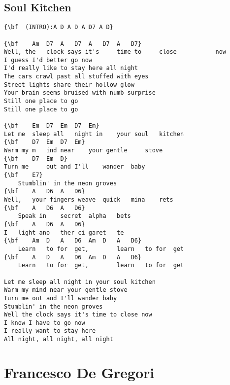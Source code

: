 \documentclass[a4paper]{article}
\begin{document}
\subsection{Soul Kitchen}
\begin{Verbatim}[commandchars=\\\{\}]
{\bf  (INTRO):A D A D A D7 A D}

{\bf   	Am	D7	A	D7	A	D7	A	D7}
Well, the 	clock says it's 	time to 	close 	    	now	 	 	 
I guess I'd better go now
I'd really like to stay here all night
The cars crawl past all stuffed with eyes
Street lights share their hollow glow
Your brain seems bruised with numb surprise
Still one place to go
Still one place to go

{\bf   	Em	D7	Em	D7	Em}
Let me 	sleep all 	night in 	your soul 	kitchen	 
{\bf   	D7	Em	D7	Em}
Warm my m	ind near 	your gentle 	stove	 
{\bf   	D7	Em	D}
Turn me 	out and I'll 	wander 	baby
{\bf   	E7}
 	Stumblin' in the neon groves
{\bf   	A	D6	A	D6}
Well, 	your fingers weave 	quick 	mina	rets
{\bf   	A	D6	A	D6}
 	Speak in 	secret 	alpha	bets
{\bf   	A	D6	A	D6}
I 	light ano	ther ci	garet	te
{\bf   	Am	D	A	D6	Am	D	A	D6}
 	Learn 	to for	get,	   	learn 	to for	get	 
{\bf   	A	D	A	D6	Am	D	A	D6}
 	Learn 	to for	get,	   	learn 	to for	get	 

Let me sleep all night in your soul kitchen
Warm my mind near your gentle stove
Turn me out and I'll wander baby
Stumblin' in the neon groves
Well the clock says it's time to close now
I know I have to go now
I really want to stay here
All night, all night, all night

\end{Verbatim}
\newpage
\section{Francesco De Gregori}
\end{document}
